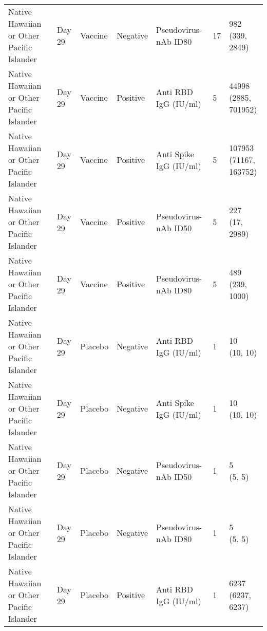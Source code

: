 \documentclass[]{book}
\theoremstyle{definition}
\theoremstyle{definition}
\theoremstyle{definition}
\newcommand{\1}{\mathbbm{1}}
\begin{document}
\begin{landscape}
\begin{ThreePartTable}
\begin{longtable}[t]{>{\raggedright\arraybackslash}p{7cm}llllll}
\hspace{1em}Native Hawaiian or Other Pacific Islander & Day 29 & Vaccine & Negative & Pseudovirus-nAb ID80 & 17 & \makecell[l]{982\\(339, 2849)}\\
\hspace{1em}Native Hawaiian or Other Pacific Islander & Day 29 & Vaccine & Positive & Anti RBD IgG (IU/ml) & 5 & \makecell[l]{44998\\(2885, 701952)}\\
\hspace{1em}Native Hawaiian or Other Pacific Islander & Day 29 & Vaccine & Positive & Anti Spike IgG (IU/ml) & 5 & \makecell[l]{107953\\(71167, 163752)}\\
\hspace{1em}Native Hawaiian or Other Pacific Islander & Day 29 & Vaccine & Positive & Pseudovirus-nAb ID50 & 5 & \makecell[l]{227\\(17, 2989)}\\
\hspace{1em}Native Hawaiian or Other Pacific Islander & Day 29 & Vaccine & Positive & Pseudovirus-nAb ID80 & 5 & \makecell[l]{489\\(239, 1000)}\\
\hspace{1em}Native Hawaiian or Other Pacific Islander & Day 29 & Placebo & Negative & Anti RBD IgG (IU/ml) & 1 & \makecell[l]{10\\(10, 10)}\\
\hspace{1em}Native Hawaiian or Other Pacific Islander & Day 29 & Placebo & Negative & Anti Spike IgG (IU/ml) & 1 & \makecell[l]{10\\(10, 10)}\\
\hspace{1em}Native Hawaiian or Other Pacific Islander & Day 29 & Placebo & Negative & Pseudovirus-nAb ID50 & 1 & \makecell[l]{5\\(5, 5)}\\
\hspace{1em}Native Hawaiian or Other Pacific Islander & Day 29 & Placebo & Negative & Pseudovirus-nAb ID80 & 1 & \makecell[l]{5\\(5, 5)}\\
\hspace{1em}Native Hawaiian or Other Pacific Islander & Day 29 & Placebo & Positive & Anti RBD IgG (IU/ml) & 1 & \makecell[l]{6237\\(6237, 6237)}\\

\end{longtable}
\end{ThreePartTable}
\end{landscape}
\end{document}
